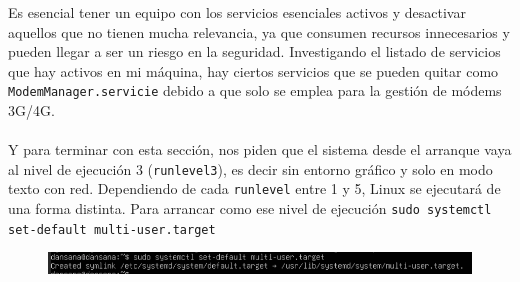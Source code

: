 \documentclass[10pt]{article}
\begin{document}
	Es esencial tener un equipo con los servicios esenciales activos y desactivar aquellos que no tienen mucha relevancia, ya que consumen recursos innecesarios y pueden llegar a ser un riesgo en la seguridad. Investigando el listado de servicios que hay activos en mi máquina, hay ciertos servicios que se pueden quitar como \verb|ModemManager.servicie| debido a que solo se emplea para la gestión de módems 3G/4G.\\\\
	Y para terminar con esta sección, nos piden que el sistema desde el arranque vaya al nivel de ejecución 3 (\verb|runlevel3|), es decir sin entorno gráfico y solo en modo texto con red. Dependiendo de cada \verb|runlevel| entre 1 y 5, Linux se ejecutará de una forma distinta. Para arrancar como ese nivel de ejecución \verb|sudo systemctl set-default multi-user.target|
	\begin{figure}[H]
		\setlength{\abovecaptionskip}{0cm}
		\setlength{\belowcaptionskip}{0cm}
		\centering
		\includegraphics[width=0.9\linewidth]{Recursos/runlevel.png}
	\end{figure}
	
\end{document}
